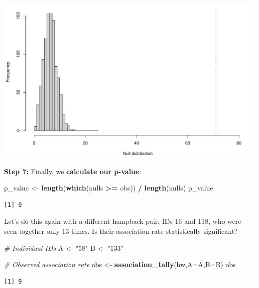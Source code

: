 \documentclass[
]{book}
\newenvironment{Shaded}{\begin{snugshade}}{\end{snugshade}}
\newcommand{\CommentTok}[1]{\textcolor[rgb]{0.56,0.35,0.01}{\textit{#1}}}
\newcommand{\DataTypeTok}[1]{\textcolor[rgb]{0.13,0.29,0.53}{#1}}
\newcommand{\KeywordTok}[1]{\textcolor[rgb]{0.13,0.29,0.53}{\textbf{#1}}}
\newcommand{\NormalTok}[1]{#1}
\newcommand{\OperatorTok}[1]{\textcolor[rgb]{0.81,0.36,0.00}{\textbf{#1}}}
\newcommand{\StringTok}[1]{\textcolor[rgb]{0.31,0.60,0.02}{#1}}
\begin{document}
\includegraphics{figures/unnamed-chunk-286-1.pdf}

\textbf{Step 7:} Finally, we \textbf{calculate our p-value}:

\begin{Shaded}
\begin{Highlighting}[]
\NormalTok{p_value <-}\StringTok{ }\KeywordTok{length}\NormalTok{(}\KeywordTok{which}\NormalTok{(nulls }\OperatorTok{>=}\StringTok{ }\NormalTok{obs)) }\OperatorTok{/}\StringTok{ }\KeywordTok{length}\NormalTok{(nulls)}
\NormalTok{p_value}
\end{Highlighting}
\end{Shaded}

\begin{verbatim}
[1] 0
\end{verbatim}

Let's do this again with a different humpback pair, IDs 16 and 118, who were seen together only 13 times. Is their association rate statistically significant?

\begin{Shaded}
\begin{Highlighting}[]
\CommentTok{# Individual IDs}
\NormalTok{A <-}\StringTok{ "58"}
\NormalTok{B <-}\StringTok{ "133"}

\CommentTok{# Observed association rate}
\NormalTok{obs <-}\StringTok{ }\KeywordTok{association_tally}\NormalTok{(hw,}\DataTypeTok{A=}\NormalTok{A,}\DataTypeTok{B=}\NormalTok{B)}
\NormalTok{obs}
\end{Highlighting}
\end{Shaded}

\begin{verbatim}
[1] 9
\end{verbatim}
\end{document}
